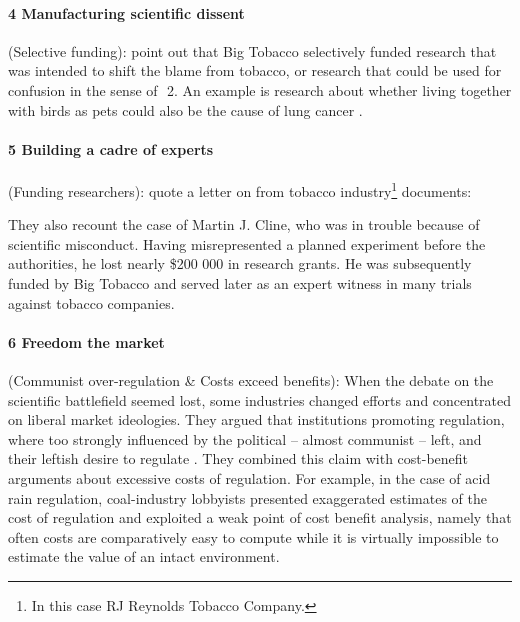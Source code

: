 \paragraph{4 Manufacturing scientific dissent} (Selective funding): \citet{abdalla_grey_2021} point out that Big Tobacco selectively funded research that was intended to shift the blame from tobacco, or research that could be used for confusion in the sense of\,  \,2. An example is research about whether living together with birds as pets could also be the cause of lung cancer \parencites{bero_lawyer_1995, brandt_inventing_2012}[cited in][]{abdalla_grey_2021}.

\paragraph{5 Building a cadre of experts} (Funding  researchers): \citet[p 29 ff]{oreskes_merchants_2010} quote a letter on  from tobacco industry\footnote{In this case RJ Reynolds Tobacco Company.} documents:  \citep{hobbs_corporate_1980} 

They also recount the case of Martin J. Cline, who was in trouble because of scientific misconduct. 
Having misrepresented a planned experiment before the authorities, he lost nearly \$200 000 in research grants.
He was subsequently funded by Big Tobacco and served later as an expert witness in many trials against tobacco companies.

\paragraph{6 Freedom  the market} (Communist over-regulation \& Costs exceed benefits): When the debate on the scientific battlefield seemed lost, some industries changed efforts and concentrated on liberal market ideologies.
They argued that institutions promoting regulation, where too strongly influenced by the political -- almost communist -- left, and their leftish desire to regulate \citep[p 166 ff]{oreskes_merchants_2010}.
They combined this claim with cost-benefit arguments about excessive costs of regulation.
For example, in the case of acid rain regulation, coal-industry lobbyists presented exaggerated estimates of the cost of regulation and exploited a weak point of cost benefit analysis, namely that often costs are comparatively easy to compute while it is virtually impossible to estimate the value of an intact environment. \citep[p 101 ff]{oreskes_merchants_2010}


